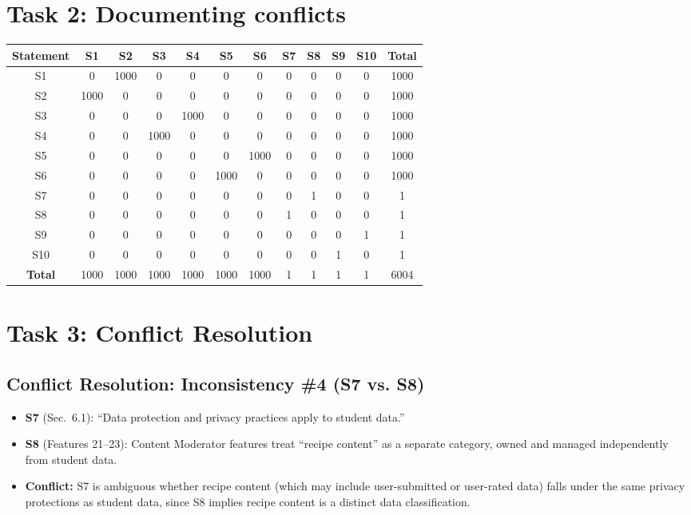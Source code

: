 \documentclass[11pt]{article}
\begin{document}
\section{Task 2: Documenting conflicts}

\small
\renewcommand{\arraystretch}{1.3}
\begin{tabular}{|c|c|c|c|c|c|c|c|c|c|c|c|}
\hline
\textbf{Statement} & \textbf{S1} & \textbf{S2} & \textbf{S3} & \textbf{S4} & \textbf{S5} & \textbf{S6} & \textbf{S7} & \textbf{S8} & \textbf{S9} & \textbf{S10} & \textbf{Total} \\
\hline
S1  & 0 & 1000 & 0 & 0 & 0 & 0 & 0 & 0 & 0 & 0 & 1000 \\
\hline
S2  & 1000 & 0 & 0 & 0 & 0 & 0 & 0 & 0 & 0 & 0 & 1000 \\
\hline
S3  & 0 & 0 & 0 & 1000 & 0 & 0 & 0 & 0 & 0 & 0 & 1000 \\
\hline
S4  & 0 & 0 & 1000 & 0 & 0 & 0 & 0 & 0 & 0 & 0 & 1000 \\
\hline
S5  & 0 & 0 & 0 & 0 & 0 & 1000 & 0 & 0 & 0 & 0 & 1000 \\
\hline
S6  & 0 & 0 & 0 & 0 & 1000 & 0 & 0 & 0 & 0 & 0 & 1000 \\
\hline
S7  & 0 & 0 & 0 & 0 & 0 & 0 & 0 & 1 & 0 & 0 & 1 \\
\hline
S8  & 0 & 0 & 0 & 0 & 0 & 0 & 1 & 0 & 0 & 0 & 1 \\
\hline
S9  & 0 & 0 & 0 & 0 & 0 & 0 & 0 & 0 & 0 & 1 & 1 \\
\hline
S10 & 0 & 0 & 0 & 0 & 0 & 0 & 0 & 0 & 1 & 0 & 1 \\
\hline
\textbf{Total} & 1000 & 1000 & 1000 & 1000 & 1000 & 1000 & 1 & 1 & 1 & 1 & 6004 \\
\hline
\end{tabular}


\section{Task 3: Conflict Resolution}

\subsection*{Conflict Resolution: Inconsistency \#4 (S7 vs. S8)}

\begin{itemize}[leftmargin=1.5em]
  \item \textbf{S7} (Sec.~6.1): ``Data protection and privacy practices apply to student data.''
  \item \textbf{S8} (Features 21--23): Content Moderator features treat ``recipe content'' as a separate category, owned and managed independently from student data.
  \item \textbf{Conflict:} S7 is ambiguous whether recipe content (which may include user-submitted or user-rated data) falls under the same privacy protections as student data, since S8 implies recipe content is a distinct data classification.
\end{itemize}
\end{document}
